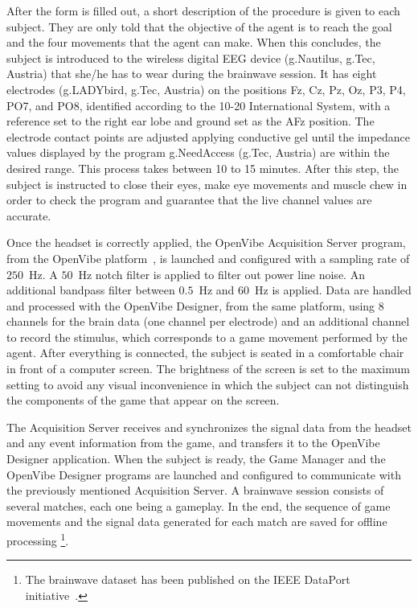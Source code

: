 \documentclass[journal]{IEEEtran}
\begin{document}
After the form is filled out, a short description of the procedure is given to each subject. They are only told that the objective of the agent is to reach the goal and the four movements that the agent can make. When this concludes, the subject is introduced to the wireless digital EEG device (g.Nautilus, g.Tec, Austria) that she/he has to wear during the brainwave session. It has eight electrodes (g.LADYbird, g.Tec, Austria) on the positions Fz, Cz, Pz, Oz, P3, P4, PO7, and PO8, identified according to the 10-20 International System, with a reference set to the right ear lobe and ground set as the AFz position. The electrode contact points are adjusted applying conductive gel until the impedance values displayed by the program g.NeedAccess (g.Tec, Austria) are within the desired range. This process takes between 10 to 15 minutes. After this step, the subject is instructed to close their eyes, make eye movements and muscle chew in order to check the program and guarantee that the live channel values are accurate.

Once the headset is correctly applied, the OpenVibe Acquisition Server program, from the OpenVibe platform~\cite{OPEN-VIBE-PAPER}, is launched and configured with a sampling rate of $250$~Hz. A $50$~Hz notch filter is applied to filter out power line noise. An additional bandpass filter between $0.5$~Hz and $60$~Hz is applied. Data are handled and processed with the OpenVibe Designer, from the same platform, using 8 channels for the brain data (one channel per electrode) and an additional channel to record the stimulus, which corresponds to a game movement performed by the agent.  After everything is connected, the subject is seated in a comfortable chair in front of a computer screen. The brightness of the screen is set to the maximum setting to avoid any visual inconvenience in which the subject can not distinguish the components of the game that appear on the screen.

The Acquisition Server receives and synchronizes the signal data from the headset and any event information from the game, and transfers it to the OpenVibe Designer application. When the subject is ready, the Game Manager and the OpenVibe Designer programs are launched and configured to communicate with the previously mentioned Acquisition Server. A brainwave session consists of several matches, each one being a gameplay.  In the end, the sequence of game movements and the signal data generated for each match are saved for offline processing \footnote{The brainwave dataset has been published on the IEEE DataPort initiative~\cite{6emh-wb46-19}.}.
\end{document}
